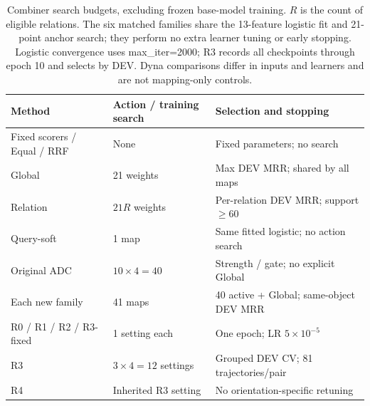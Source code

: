 \begin{table}[htbp]
\centering\footnotesize
\setlength{\tabcolsep}{4pt}
\caption{Combiner search budgets, excluding frozen base-model training. $R$ is the count of eligible relations. The six matched families share the 13-feature logistic fit and 21-point anchor search; they perform no extra learner tuning or early stopping. Logistic convergence uses max\_iter=2000; R3 records all checkpoints through epoch 10 and selects by DEV. Dyna comparisons differ in inputs and learners and are not mapping-only controls.}
\label{tab:matched-budget}
\begin{tabular}{lll}
\toprule
Method & Action / training search & Selection and stopping\\
\midrule
Fixed scorers / Equal / RRF & None & Fixed parameters; no search\\
Global & 21 weights & Max DEV MRR; shared by all maps\\
Relation & $21R$ weights & Per-relation DEV MRR; support $\geq60$\\
Query-soft & 1 map & Same fitted logistic; no action search\\
Original ADC & $10\times4=40$ & Strength / gate; no explicit Global\\
Each new family & 41 maps & 40 active + Global; same-object DEV MRR\\
R0 / R1 / R2 / R3-fixed & 1 setting each & One epoch; LR $5\times10^{-5}$\\
R3 & $3\times4=12$ settings & Grouped DEV CV; 81 trajectories/pair\\
R4 & Inherited R3 setting & No orientation-specific retuning\\
\bottomrule
\end{tabular}
\end{table}
